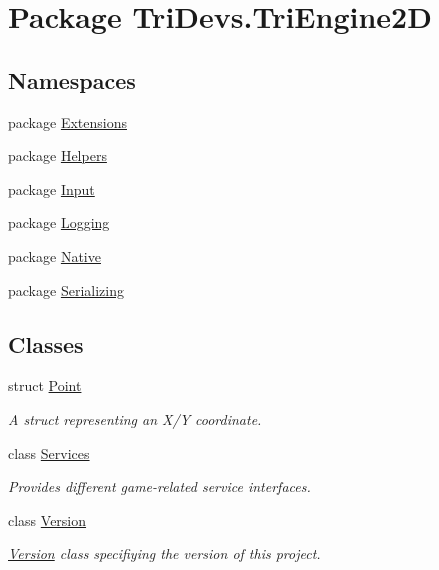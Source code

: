 \hypertarget{namespace_tri_devs_1_1_tri_engine2_d}{\section{Package Tri\-Devs.\-Tri\-Engine2\-D}
\label{namespace_tri_devs_1_1_tri_engine2_d}
}
\subsection*{Namespaces}
\begin{DoxyCompactItemize}
\item 
package \hyperlink{namespace_tri_devs_1_1_tri_engine2_d_1_1_extensions}{Extensions}
\item 
package \hyperlink{namespace_tri_devs_1_1_tri_engine2_d_1_1_helpers}{Helpers}
\item 
package \hyperlink{namespace_tri_devs_1_1_tri_engine2_d_1_1_input}{Input}
\item 
package \hyperlink{namespace_tri_devs_1_1_tri_engine2_d_1_1_logging}{Logging}
\item 
package \hyperlink{namespace_tri_devs_1_1_tri_engine2_d_1_1_native}{Native}
\item 
package \hyperlink{namespace_tri_devs_1_1_tri_engine2_d_1_1_serializing}{Serializing}
\end{DoxyCompactItemize}
\subsection*{Classes}
\begin{DoxyCompactItemize}
\item 
struct \hyperlink{struct_tri_devs_1_1_tri_engine2_d_1_1_point}{Point}
\begin{DoxyCompactList}\small\item\em A struct representing an X/\-Y coordinate. \end{DoxyCompactList}\item 
class \hyperlink{class_tri_devs_1_1_tri_engine2_d_1_1_services}{Services}
\begin{DoxyCompactList}\small\item\em Provides different game-\/related service interfaces. \end{DoxyCompactList}\item 
class \hyperlink{class_tri_devs_1_1_tri_engine2_d_1_1_version}{Version}
\begin{DoxyCompactList}\small\item\em \hyperlink{class_tri_devs_1_1_tri_engine2_d_1_1_version}{Version} class specifiying the version of this project. \end{DoxyCompactList}\end{DoxyCompactItemize}
